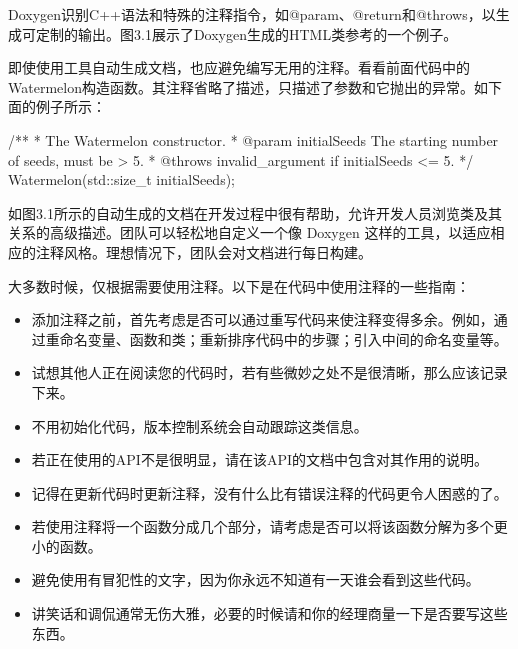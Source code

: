 Doxygen识别C++语法和特殊的注释指令，如@param、@return和@throws，以生成可定制的输出。图3.1展示了Doxygen生成的HTML类参考的一个例子。

即使使用工具自动生成文档，也应避免编写无用的注释。看看前面代码中的Watermelon构造函数。其注释省略了描述，只描述了参数和它抛出的异常。如下面的例子所示：

\begin{cpp}
/**
 * The Watermelon constructor.
 * @param initialSeeds The starting number of seeds, must be > 5.
 * @throws invalid_argument if initialSeeds <= 5.
 */
Watermelon(std::size_t initialSeeds);
\end{cpp}


如图3.1所示的自动生成的文档在开发过程中很有帮助，允许开发人员浏览类及其关系的高级描述。团队可以轻松地自定义一个像 Doxygen 这样的工具，以适应相应的注释风格。理想情况下，团队会对文档进行每日构建。


大多数时候，仅根据需要使用注释。以下是在代码中使用注释的一些指南：

\begin{itemize}
\item
添加注释之前，首先考虑是否可以通过重写代码来使注释变得多余。例如，通过重命名变量、函数和类；重新排序代码中的步骤；引入中间的命名变量等。

\item
试想其他人正在阅读您的代码时，若有些微妙之处不是很清晰，那么应该记录下来。

\item
不用初始化代码，版本控制系统会自动跟踪这类信息。

\item
若正在使用的API不是很明显，请在该API的文档中包含对其作用的说明。

\item
记得在更新代码时更新注释，没有什么比有错误注释的代码更令人困惑的了。

\item
若使用注释将一个函数分成几个部分，请考虑是否可以将该函数分解为多个更小的函数。

\item
避免使用有冒犯性的文字，因为你永远不知道有一天谁会看到这些代码。

\item
讲笑话和调侃通常无伤大雅，必要的时候请和你的经理商量一下是否要写这些东西。
\end{itemize}


